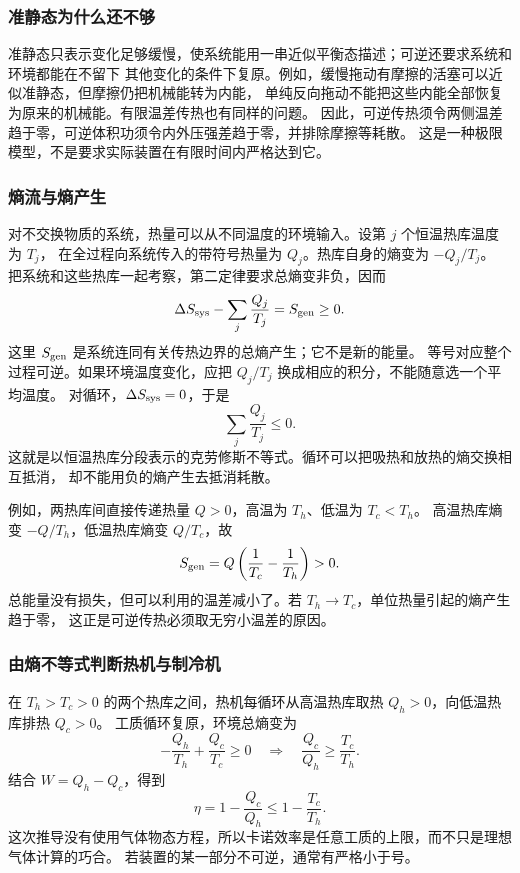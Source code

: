 \subsubsection*{准静态为什么还不够}

准静态只表示变化足够缓慢，使系统能用一串近似平衡态描述；可逆还要求系统和环境都能在不留下
其他变化的条件下复原。例如，缓慢拖动有摩擦的活塞可以近似准静态，但摩擦仍把机械能转为内能，
单纯反向拖动不能把这些内能全部恢复为原来的机械能。有限温差传热也有同样的问题。
因此，可逆传热须令两侧温差趋于零，可逆体积功须令内外压强差趋于零，并排除摩擦等耗散。
这是一种极限模型，不是要求实际装置在有限时间内严格达到它。

\subsubsection*{熵流与熵产生}

对不交换物质的系统，热量可以从不同温度的环境输入。设第 $j$ 个恒温热库温度为 $T_j$，
在全过程向系统传入的带符号热量为 $Q_j$。热库自身的熵变为 $-Q_j/T_j$。
把系统和这些热库一起考察，第二定律要求总熵变非负，因而
\begin{equation}
 \Delta S_{\rm sys}-\sum_j\frac{Q_j}{T_j}=S_{\rm gen}\ge0.
\end{equation}
这里 $S_{\rm gen}$ 是系统连同有关传热边界的总熵产生；它不是新的能量。
等号对应整个过程可逆。如果环境温度变化，应把 $Q_j/T_j$ 换成相应的积分，不能随意选一个平均温度。
对循环，$\Delta S_{\rm sys}=0$，于是
\begin{equation}
 \sum_j\frac{Q_j}{T_j}\le0.
\end{equation}
这就是以恒温热库分段表示的克劳修斯不等式。循环可以把吸热和放热的熵交换相互抵消，
却不能用负的熵产生去抵消耗散。

例如，两热库间直接传递热量 $Q>0$，高温为 $T_h$、低温为 $T_c<T_h$。
高温热库熵变 $-Q/T_h$，低温热库熵变 $Q/T_c$，故
\[
 S_{\rm gen}=Q\left(\frac1{T_c}-\frac1{T_h}\right)>0.
\]
总能量没有损失，但可以利用的温差减小了。若 $T_h\to T_c$，单位热量引起的熵产生趋于零，
这正是可逆传热必须取无穷小温差的原因。

\subsubsection*{由熵不等式判断热机与制冷机}

在 $T_h>T_c>0$ 的两个热库之间，热机每循环从高温热库取热 $Q_h>0$，向低温热库排热 $Q_c>0$。
工质循环复原，环境总熵变为
\[
 -\frac{Q_h}{T_h}+\frac{Q_c}{T_c}\ge0
 \quad\Longrightarrow\quad
 \frac{Q_c}{Q_h}\ge\frac{T_c}{T_h}.
\]
结合 $W=Q_h-Q_c$，得到
\begin{equation}
 \eta=1-\frac{Q_c}{Q_h}\le1-\frac{T_c}{T_h}.
\end{equation}
这次推导没有使用气体物态方程，所以卡诺效率是任意工质的上限，而不只是理想气体计算的巧合。
若装置的某一部分不可逆，通常有严格小于号。


